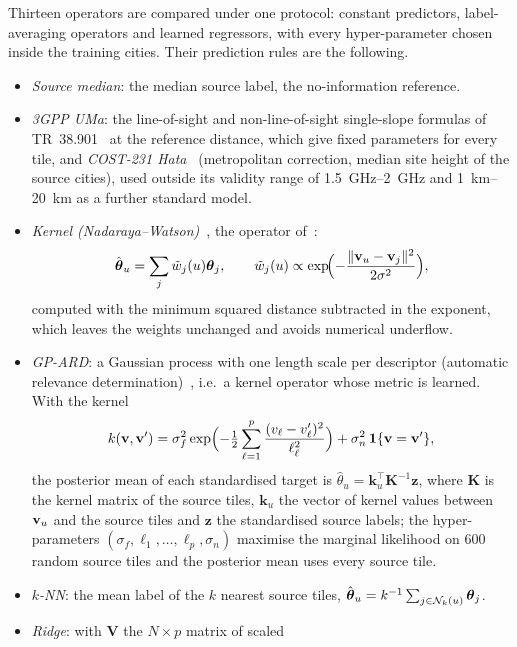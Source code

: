 Thirteen operators are compared under one protocol: constant predictors,
label-averaging operators and learned regressors, with every
hyper-parameter chosen inside the training cities. Their prediction rules
are the following.
\begin{itemize}
\item \emph{Source median}: the median source label, the no-information
reference.
\item \emph{3GPP UMa}: the line-of-sight and non-line-of-sight single-slope
formulas of TR~38.901~\cite{tr38901} at the reference distance, which give
fixed parameters for every tile, and \emph{COST-231 Hata}~\cite{cost231}
(metropolitan correction, median site height of the source cities), used
outside its validity range of \SIrange{1.5}{2}{\giga\hertz} and
\SIrange{1}{20}{\kilo\metre} as a further standard model.
\item \emph{Kernel (Nadaraya--Watson)}~\cite{nadaraya1964,watson1964}, the
operator of~\cite{ozyurt2026}:
\begin{equation}
\hat{\boldsymbol{\theta}}_u=\sum_j\tilde w_j(u)\boldsymbol{\theta}_j,\qquad
\tilde w_j(u)\propto\exp\!\Bigl(-\frac{\lVert\mathbf{v}_u-\mathbf{v}_j\rVert^{2}}{2\sigma^{2}}\Bigr),
\label{eq:nw}
\end{equation}
computed with the minimum squared distance subtracted in the exponent, which
leaves the weights unchanged and avoids numerical underflow.
\item \emph{GP-ARD}: a Gaussian process with one length scale per
descriptor (automatic relevance determination)~\cite{rasmussen2006}, i.e.\ a
kernel operator whose metric is learned. With the kernel
\begin{equation}
k(\mathbf{v},\mathbf{v}')=\sigma_f^{2}\exp\Bigl(-\tfrac12\sum_{\ell=1}^{p}\frac{(v_\ell-v'_\ell)^{2}}{\ell_\ell^{2}}\Bigr)
+\sigma_n^{2}\,\mathbf{1}\{\mathbf{v}=\mathbf{v}'\},
\label{eq:ard}
\end{equation}
the posterior mean of each standardised target is
$\hat\theta_u=\mathbf{k}_u^{\top}\mathbf{K}^{-1}\mathbf{z}$, where
$\mathbf{K}$ is the kernel matrix of the source tiles, $\mathbf{k}_u$ the
vector of kernel values between $\mathbf{v}_u$ and the source tiles and
$\mathbf{z}$ the standardised source labels; the hyper-parameters
$(\sigma_f,\ell_1,\dots,\ell_p,\sigma_n)$ maximise the marginal likelihood
on \num{600} random source tiles and the posterior mean uses every source
tile.
\item \emph{$k$-NN}: the mean label of the $k$ nearest source tiles,
$\hat{\boldsymbol{\theta}}_u=k^{-1}\sum_{j\in\mathcal{N}_k(u)}\boldsymbol{\theta}_j$.
\item \emph{Ridge}: with $\mathbf{V}$ the $N\times p$ matrix of scaled

\end{itemize}
